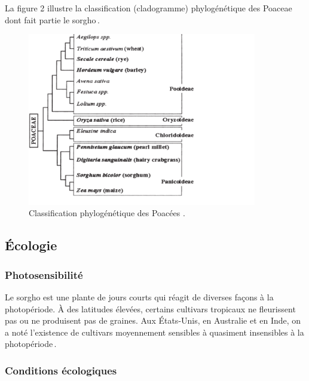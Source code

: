 \documentclass[a4paper,11pt]{article}
\begin{document}
La figure 2 illustre la classification (cladogramme) phylogénétique
des Poaceae dont fait partie le sorgho\,\cite{Paquet_2005}.



\begin{figure}%
  \begin{center}
    \includegraphics[width=10cm]{images/PoaceaePhylogeny}
  \end{center}
\caption{Classification phylogénétique des Poacées \protect\cite{Paquet_2005}.}
\end{figure}


\subsection{Écologie}

\subsubsection{Photosensibilité}

Le sorgho est une plante de jours courts qui réagit de diverses façons
à la photopériode. À des latitudes élevées, certains cultivars
tropicaux ne fleurissent pas ou ne produisent pas de graines. Aux
États-Unis, en Australie et en Inde, on a noté l'existence de
cultivars moyennement sensibles à quasiment insensibles à la
photopériode\,\cite{BARRO_KONDOMBO_2010}.

\subsubsection{Conditions écologiques}
\end{document}
